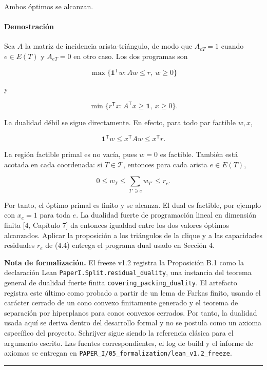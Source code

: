 \documentclass[
  spanish,
  11pt,
  a4paper,
]{article}
\begin{document}
Ambos óptimos se alcanzan.

\paragraph{Demostración}\label{demostraciuxf3n-2}

Sea \(A\) la matriz de incidencia arista-triángulo, de modo que \(A_{eT}=1\) cuando \(e\in E(T)\) y \(A_{eT}=0\) en otro caso. Los dos programas son

\[
\max\{\mathbf 1^{\mathsf T}w:Aw\le r,\ w\ge0\}
\]

y

\[
\min\{r^{\mathsf T}x:A^{\mathsf T}x\ge\mathbf 1,\ x\ge0\}.
\]

La dualidad débil se sigue directamente. En efecto, para todo par factible \(w,x\),

\[
\mathbf 1^{\mathsf T}w
\le
x^{\mathsf T}Aw
\le
x^{\mathsf T}r.
\]

La región factible primal es no vacía, pues \(w=0\) es factible. También está acotada en cada coordenada: si \(T\in\mathcal T\), entonces para cada arista \(e\in E(T)\),

\[
0\le w_T\le\sum_{T'\ni e}w_{T'}\le r_e.
\]

Por tanto, el óptimo primal es finito y se alcanza. El dual es factible, por ejemplo con \(x_e=1\) para toda \(e\). La dualidad fuerte de programación lineal en dimensión finita {[}4, Capítulo 7{]} da entonces igualdad entre los dos valores óptimos alcanzados. Aplicar la proposición a los triángulos de la clique y a las capacidades residuales \(r_e\) de (4.4) entrega el programa dual usado en Sección 4.

\textbf{Nota de formalización.} El freeze v1.2 registra la Proposición B.1 como la declaración Lean \texttt{PaperI.Split.residual\_duality}, una instancia del teorema general de dualidad fuerte finita \texttt{covering\_packing\_duality}. El artefacto registra este último como probado a partir de un lema de Farkas finito, usando el carácter cerrado de un cono convexo finitamente generado y el teorema de separación por hiperplanos para conos convexos cerrados. Por tanto, la dualidad usada aquí se deriva dentro del desarrollo formal y no se postula como un axioma específico del proyecto. Schrijver sigue siendo la referencia clásica para el argumento escrito. Las fuentes correspondientes, el log de build y el informe de axiomas se entregan en \texttt{PAPER\_I/05\_formalization/lean\_v1.2\_freeze}.

\begin{center}\rule{0.5\linewidth}{0.5pt}\end{center}
\end{document}
